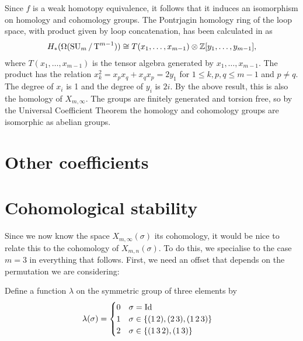 Since $f$ is a weak homotopy equivalence, it follows that it induces
an isomorphism on homology and cohomology groups. The Pontrjagin
homology ring of the loop space, with product given by loop
concatenation, has been calculated in \cite[Theorem~4.1]{grbic} as
\begin{align*}
  H_*(\Omega(\operatorname{SU}_{m}/\operatorname{T}^{m-1})) \cong T(x_1,\dots,x_{m-1}) \otimes
  \mathbb{Z}[y_1,\dots,y_{m-1}],
\end{align*}
where $T(x_1,\dots,x_{m-1})$ is the tensor algebra generated by
$x_1,\dots,x_{m-1}$. The product has the relation $x_k^2 =
x_px_q+x_qx_p = 2y_1$ for $1\leq k,p,q\leq m-1$ and $p\neq q$. The
degree of $x_i$ is 1 and the degree of $y_i$
is $2i$. By the above result, this is also the homology of
$X_{m,\infty}$. The groups are finitely generated and torsion free, so
by the Universal Coefficient Theorem the homology and cohomology
groups are isomorphic as abelian groups.



\section{Other coefficients}
\label{sec:coef}


\section{Cohomological stability}
\label{sec:costa}
Since we now know the space $X_{m,\infty}(\sigma)$ its cohomology, it
would be nice to relate this to the cohomology of
$X_{m,n}(\sigma)$. To do
this, we specialise to the case $m = 3$ in everything that
follows. First, we need an offset that depends on the permutation
we are considering:
\begin{definition}
  Define a function $\lambda$ on the symmetric group of three elements
  by
  \begin{align*}
    \lambda(\sigma) &=
                      \begin{cases}
                        0 & \sigma = \operatorname{Id} \\
                        1 & \sigma \in \left\{ (1\,2),(2\,3),(1\,2\,3) \right\}
                        \\
                        2 & \sigma \in \left\{ (1\,3\,2), (1\,3) \right\}
                      \end{cases}
  \end{align*}
\end{definition}

